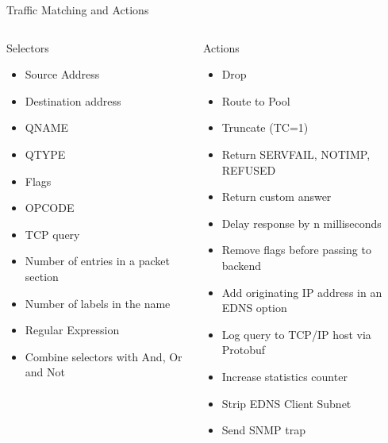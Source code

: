 \documentclass{beamer}
\begin{document}
\begin{frame}{Traffic Matching and Actions}
  \begin{columns}
    \begin{column}{0.5\textwidth}
      {\tiny
        \begin{block}{Selectors}
          \begin{itemize}
            \item Source Address
            \item Destination address
            \item QNAME
            \item QTYPE
            \item Flags
            \item OPCODE
            \item TCP query
            \item Number of entries in a packet section
            \item Number of labels in the name
            \item Regular Expression
            \item Combine selectors with And, Or and Not
          \end{itemize}
        \end{block}
      }
    \end{column}

    \begin{column}{0.5\textwidth}
      {\tiny
        \begin{block}{Actions}
          \begin{itemize}
            \item Drop
            \item Route to Pool
            \item Truncate (TC=1)
            \item Return SERVFAIL, NOTIMP, REFUSED
            \item Return custom answer
            \item Delay response by n milliseconds
            \item Remove flags before passing to backend
            \item Add originating IP address in an EDNS option
            \item Log query to TCP/IP host via Protobuf
            \item Increase statistics counter
            \item Strip EDNS Client Subnet
            \item Send SNMP trap
          \end{itemize}
        \end{block}
      }
    \end{column}
  \end{columns}
\end{frame}
\end{document}
